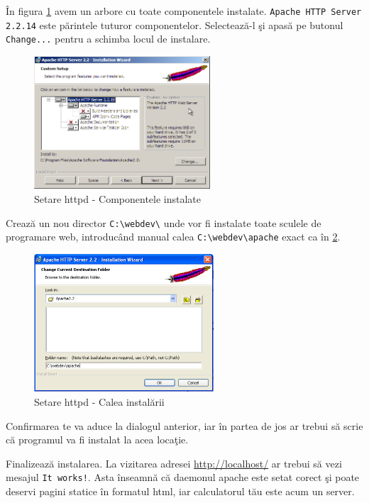 În figura \ref{fig:httpd components tree} avem un arbore cu toate componentele instalate. \texttt{Apache HTTP Server 2.2.14}
este părintele tuturor componentelor. Selectează-l şi apasă pe butonul
\texttt{Change...} pentru a schimba locul de instalare.

\begin{figure}[ht!]
  \centering
    \includegraphics[width=248px]{cap01/Screenshot-4.png}
  \caption{Setare httpd - Componentele instalate}
  \label{fig:httpd components tree}
\end{figure}

Crează un nou director \texttt{C:{\textbackslash}webdev\textbackslash}
unde vor fi instalate toate sculele
de programare web, introducând manual calea \texttt{C:{\textbackslash}webdev{\textbackslash}apache}
exact ca în \ref{fig:httpd custom path}.

\begin{figure}[ht!]
  \centering
    \includegraphics[width=253px]{cap01/Screenshot-5.png}
  \caption{Setare httpd - Calea instalării}
  \label{fig:httpd custom path}
\end{figure}

Confirmarea te va aduce la dialogul anterior, iar în partea de jos ar trebui să scrie
că programul va fi instalat la acea locaţie.

Finalizează instalarea. La vizitarea adresei \url{http://localhost/} ar trebui să
vezi mesajul \texttt{It works!}. Asta înseamnă că daemonul apache este setat corect şi poate deservi
pagini statice în formatul html, iar calculatorul tău este acum un server.

